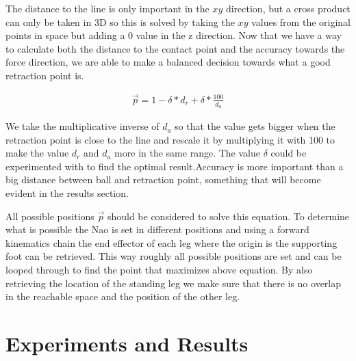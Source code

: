 \documentclass[a4paper]{article}
\begin{document}
The distance to the line is only important in the $xy$ direction, but a cross
product can only be taken in 3D so this is solved by taking the $xy$
values from the original points in space but adding a 0 value in the z
direction.
Now that we have a way to calculate both the distance to the contact point and
the accuracy towards the force direction, we are able to make a balanced
decision towards what a good retraction point is.

\begin{align}
    \vec{p} = 1-\delta * d_r + \delta * \frac{100}{d_a}
\label{eq:delta}
\end{align}

We take the multiplicative inverse of $d_a$ so that the value gets bigger when the
retraction point is close to the line and rescale it by multiplying it with 100 to
make the value $d_r$ and $d_a$ more in the same range. The value $\delta$  could
be experimented with to find the optimal result.Accuracy is more important than a big distance between ball and
retraction point, something that will become evident in the results section.

All possible positions $\vec{p}$ should be considered to solve this equation. To
determine what is possible the Nao is set in different positions and using a
forward kinematics chain the end effector of each leg where the origin is the
supporting foot can be retrieved. This way roughly all possible positions are set and can be
looped through to find the point that maximizes above equation. By also
retrieving the location of the standing leg we make sure that there is
no overlap in the reachable space and the position of the other leg.

\section{Experiments and Results}
\end{document}
